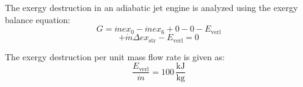 The exergy destruction in an adiabatic jet engine is analyzed using the exergy balance equation:  
\[
G = \dot{m} ex_0 - \dot{m} ex_6 + 0 - 0 - E_{\text{verl}}
\]  
\[
+ \dot{m} \Delta ex_{\text{str}} - E_{\text{verl}} = 0
\]  

The exergy destruction per unit mass flow rate is given as:  
\[
\frac{E_{\text{verl}}}{\dot{m}} = 100 \, \frac{\text{kJ}}{\text{kg}}
\]